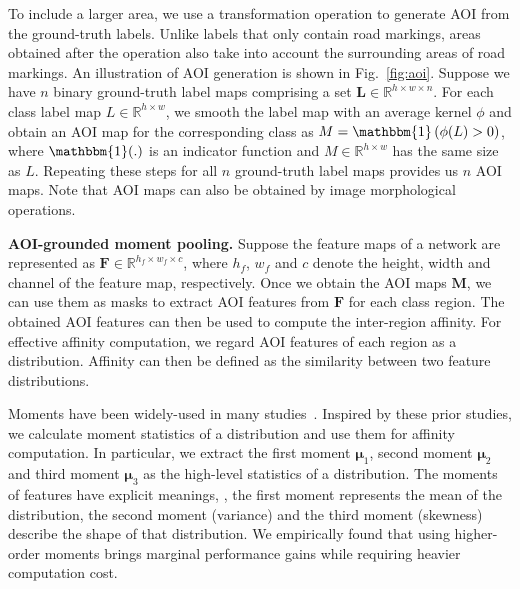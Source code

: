 \documentclass[10pt,twocolumn,letterpaper]{article}
\begin{document}
To include a larger area, we use a transformation operation to generate AOI from the ground-truth labels. Unlike labels that only contain road markings, areas obtained after the operation also take into account the surrounding areas of road markings.
An illustration of AOI generation is shown in Fig.~\ref{fig:aoi}.
Suppose we have $n$ binary ground-truth label maps comprising a set $\mathbf{L} \in \mathbb{R}^{h \times w \times n}$. 
For each class label map $L \in \mathbb{R}^{h \times w}$, we smooth the label map with an average kernel $\phi$ and obtain an AOI map for the corresponding class as $M = \mathbbm{1}\left(\phi(L)>0\right)$, where $\mathbbm{1}(.)$ is an indicator function and $M \in \mathbb{R}^{h \times w}$ has the same size as $L$. 
Repeating these steps for all $n$ ground-truth label maps provides us $n$ AOI maps.
Note that AOI maps can also be obtained by image morphological operations.






\vspace{0.1cm}
\noindent \textbf{AOI-grounded moment pooling.} 
Suppose the feature maps of a network are represented as $\mathbf{F} \in \mathbb{R}^{h_{f} \times w_{f} \times c}$, where $h_{f}$, $w_{f}$ and $c$ denote the height, width and channel of the feature map, respectively. 
Once we obtain the AOI maps $\mathbf{M}$, we can use them as masks to extract AOI features from $\mathbf{F}$ for each class region. 
The obtained AOI features can then be used to compute the inter-region affinity.
For effective affinity computation, we regard AOI features of each region as a distribution. Affinity can then be defined as the similarity between two feature distributions. 


Moments have been widely-used in many studies~\cite{Peng_2019_ICCV,zellinger2017central}. 
Inspired by these prior studies, we calculate moment statistics of a distribution and use them for affinity computation. In particular, we extract the first moment $\boldsymbol{\mu}_{1}$, second moment $\boldsymbol{\mu}_{2}$ and third moment $\boldsymbol{\mu}_{3}$ as the high-level statistics of a distribution. 
The moments of features have explicit meanings, \ie, the first moment represents the mean of the distribution, the second moment (variance) and the third moment (skewness) describe the shape of that distribution.
We empirically found that using higher-order moments brings marginal performance gains while requiring heavier computation cost.
\end{document}
